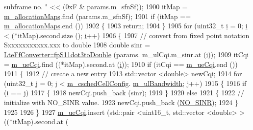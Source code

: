 \begin{DoxyCode}
{       subframe no. "} << (0xF & params.m\_sfnSf));
1900         itMap = \hyperlink{classns3_1_1FdBetFfMacScheduler_a4263d235edb72f1e37dc659586eb0253}{m\_allocationMaps}.find (params.m\_sfnSf);
1901         \textcolor{keywordflow}{if} (itMap == \hyperlink{classns3_1_1FdBetFfMacScheduler_a4263d235edb72f1e37dc659586eb0253}{m\_allocationMaps}.end ())
1902           \{
1903             \textcolor{keywordflow}{return};
1904           \}
1905         \textcolor{keywordflow}{for} (uint32\_t \hyperlink{bernuolliDistribution_8m_a6f6ccfcf58b31cb6412107d9d5281426}{i} = 0; \hyperlink{bernuolliDistribution_8m_a6f6ccfcf58b31cb6412107d9d5281426}{i} < (*itMap).second.size (); \hyperlink{bernuolliDistribution_8m_a6f6ccfcf58b31cb6412107d9d5281426}{i}++)
1906           \{
1907             \textcolor{comment}{// convert from fixed point notation Sxxxxxxxxxxx.xxx to double}
1908             \textcolor{keywordtype}{double} sinr = \hyperlink{classns3_1_1LteFfConverter_aa5d8c2a8f988dbd63da91818c18666eb}{LteFfConverter::fpS11dot3toDouble} (params.
      m\_ulCqi.m\_sinr.at (\hyperlink{bernuolliDistribution_8m_a6f6ccfcf58b31cb6412107d9d5281426}{i}));
1909             itCqi = \hyperlink{classns3_1_1FdBetFfMacScheduler_a8cb7a6ccbbc1ee0a6dd2872cdc9d131e}{m\_ueCqi}.find ((*itMap).second.at (\hyperlink{bernuolliDistribution_8m_a6f6ccfcf58b31cb6412107d9d5281426}{i}));
1910             \textcolor{keywordflow}{if} (itCqi == \hyperlink{classns3_1_1FdBetFfMacScheduler_a8cb7a6ccbbc1ee0a6dd2872cdc9d131e}{m\_ueCqi}.end ())
1911               \{
1912                 \textcolor{comment}{// create a new entry}
1913                 std::vector <double> newCqi;
1914                 \textcolor{keywordflow}{for} (uint32\_t j = 0; j < \hyperlink{classns3_1_1FdBetFfMacScheduler_a52a10018d36c6a2e69820346a327dfc9}{m\_cschedCellConfig}.
      \hyperlink{structns3_1_1FfMacCschedSapProvider_1_1CschedCellConfigReqParameters_a5ab5b102878e6e7e7727a14af4a64d2f}{m\_ulBandwidth}; j++)
1915                   \{
1916                     \textcolor{keywordflow}{if} (\hyperlink{bernuolliDistribution_8m_a6f6ccfcf58b31cb6412107d9d5281426}{i} == j)
1917                       \{
1918                         newCqi.push\_back (sinr);
1919                       \}
1920                     \textcolor{keywordflow}{else}
1921                       \{
1922                         \textcolor{comment}{// initialize with NO\_SINR value.}
1923                         newCqi.push\_back (\hyperlink{cqa-ff-mac-scheduler_8h_a520d71777be043568160c783a9c65fd5}{NO\_SINR});
1924                       \}
1925 
1926                   \}
1927                 \hyperlink{classns3_1_1FdBetFfMacScheduler_a8cb7a6ccbbc1ee0a6dd2872cdc9d131e}{m\_ueCqi}.insert (std::pair <uint16\_t, std::vector <double> > ((*itMap).second.at (

\end{DoxyCode}
